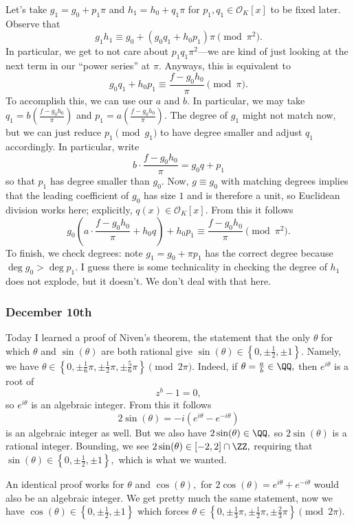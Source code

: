 Let's take $g_1=g_0+p_1\pi$ and $h_1=h_0+q_1\pi$ for $p_1,q_1\in\mathcal O_K[x]$ to be fixed later. Observe that
\[g_1h_1\equiv g_0+(g_0q_1+h_0p_1)\pi\pmod{\pi^2}.\]
In particular, we get to not care about $p_1q_1\pi^2$---we are kind of just looking at the next term in our ``power series'' at $\pi.$ Anyways, this is equivalent to
\[g_0q_1+h_0p_1\equiv\frac{f-g_0h_0}\pi\pmod\pi.\]
To accomplish this, we can use our $a$ and $b.$ In particular, we may take $q_1=b\left(\frac{f-g_0h_0}\pi\right)$ and $p_1=a\left(\frac{f-g_0h_0}\pi\right).$ The degree of $g_1$ might not match now, but we can just reduce $p_1\pmod{g_1}$ to have degree smaller and adjust $q_1$ accordingly. In particular, write
\[b\cdot\frac{f-g_0h_0}\pi=g_0q+p_1\]
so that $p_1$ has degree smaller than $g_0.$ Now, $g\equiv g_0$ with matching degrees implies that the leading coefficient of $g_0$ has size $1$ and is therefore a unit, so Euclidean division works here; explicitly, $q(x)\in\mathcal O_K[x].$ From this it follows
\[g_0\left(a\cdot\frac{f-g_0h_0}\pi+h_0q\right)+h_0p_1\equiv\frac{f-g_0h_0}\pi\pmod{\pi^2}.\]
To finish, we check degrees: note $g_1=g_0+\pi p_1$ has the correct degree because $\deg g_0>\deg p_1.$ I guess there is some technicality in checking the degree of $h_1$ does not explode, but it doesn't. We don't deal with that here.

\subsubsection{December 10th}
Today I learned a proof of Niven's theorem, the statement that the only $\theta$ for which $\theta$ and $\sin(\theta)$ are both rational give $\sin(\theta)\in\left\{0,\pm\frac12,\pm1\right\}.$ Namely, we have $\theta\in\left\{0,\pm\frac16\pi,\pm\frac12\pi,\pm\frac56\pi\right\}\pmod{2\pi}.$ Indeed, if $\theta=\frac ab\in\QQ,$ then $e^{i\theta}$ is a root of
\[z^b-1=0,\]
so $e^{i\theta}$ is an algebraic integer. From this it follows
\[2\sin(\theta)=-i\left(e^{i\theta}-e^{-i\theta}\right)\]
is an algebraic integer as well. But we also have $2\sin(\theta)\in\QQ,$ so $2\sin(\theta)$ is a rational integer. Bounding, we see $2\sin(\theta)\in[-2,2]\cap\ZZ,$ requiring that $\sin(\theta)\in\left\{0,\pm\frac12,\pm1\right\},$ which is what we wanted.

An identical proof works for $\theta$ and $\cos(\theta),$ for $2\cos(\theta)=e^{i\theta}+e^{-i\theta}$ would also be an algebraic integer. We get pretty much the same statement, now we have $\cos(\theta)\in\left\{0,\pm\frac12,\pm1\right\}$ which forces $\theta\in\left\{0,\pm\frac13\pi,\pm\frac12\pi,\pm\frac23\pi\right\}\pmod{2\pi}.$

